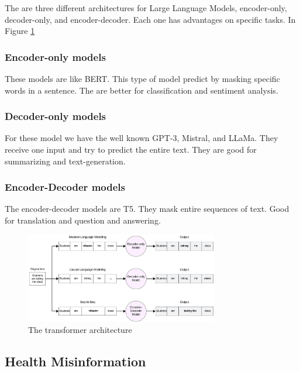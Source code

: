 The are three different architectures for Large Language Models, encoder-only, decoder-only, and encoder-decoder. Each one has advantages on specific tasks. In Figure \ref{architecture}

\subsubsection{Encoder-only models}
These models are like BERT.
This type of model predict by masking specific words in a sentence.
The are better for classification and sentiment analysis.

\subsubsection{Decoder-only models}
For these model we have the well known GPT-3, Mistral, and LLaMa.
They receive one input and try to predict the entire text.
They are good for summarizing and text-generation.

\subsubsection{Encoder-Decoder models}
The encoder-decoder models are T5.
They mask entire sequences of text.
Good for translation and question and answering. \cite{9906925}

\begin{figure}[!htb]
    \centering
        \includegraphics[width=0.75\textwidth]{figures/LLM_Arch_text_generation.jpeg}
        \caption{The transformer architecture}
        \label{architecture}
\end{figure}

\subsection{Health Misinformation}
